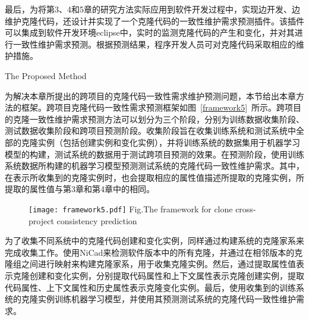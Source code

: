 
最后，为将第3、4和5章的研究方法实际应用到软件开发过程中，实现边开发、边维护克隆代码，还设计并实现了一个克隆代码的一致性维护需求预测插件。该插件可以集成到软件开发环境eclipse中，实时的监测克隆代码的产生和变化，并对其进行一致性维护需求预测。根据预测结果，程序开发人员可对克隆代码采取相应的维护措施。


{The Proposed Method}

为解决本章所提出的跨项目的克隆代码一致性需求维护预测问题，本节给出本章方法的框架。跨项目克隆代码一致性需求预测框架如图~\ref{framework5}~所示。跨项目的克隆一致性维护需求预测方法可以划分为三个阶段，分别为训练数据收集阶段、测试数据收集阶段和跨项目预测阶段。收集阶段旨在收集训练系统和测试系统中全部的克隆实例（包括创建实例和变化实例），并将训练系统的数据集用于机器学习模型的构建，测试系统的数据用于测试跨项目预测的效果。在预测阶段，使用训练系统数据所构建的机器学习模型预测测试系统的克隆代码一致性维护需求。其中，在表示所收集到的克隆实例时，也会提取相应的属性值描述所提取的克隆实例，所提取的属性值与第3章和第4章中的相同。

\begin{figure}[htbp]
\centering
\texttt{[image: framework5.pdf]}
{Fig.$\!$}{The framework for clone cross-project consistency prediction}
\vspace{-1em}
\end{figure}

为了收集不同系统中的克隆代码创建和变化实例，同样通过构建系统的克隆家系来完成收集工作。使用NiCad来检测软件版本中的所有克隆，并通过在相邻版本的克隆组之间进行映射来构建克隆家系，用于收集克隆实例。然后，通过提取属性值表示克隆创建和变化实例，分别提取代码属性和上下文属性表示克隆创建实例，提取代码属性、上下文属性和历史属性表示克隆变化实例。最后，使用收集到的训练系统的克隆实例训练机器学习模型，并使用其预测测试系统的克隆代码一致性维护需求。

